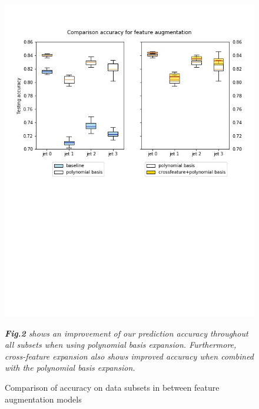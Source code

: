 \documentclass[10pt,a4paper]{article}
\begin{document}
\begin{figure}[H]
\begin{center}
\includegraphics[scale=0.45,trim=0cm 11cm 0cm 2cm, clip=true]{featureAccuracy3.jpeg}
\caption{\label{Fig.2}Comparison of accuracy on data subsets in between feature augmentation models}
\end{center}
\textit{\footnotesize{\textbf{Fig.2} shows an improvement of our prediction accuracy throughout all subsets when using polynomial basis expansion. Furthermore, cross-feature expansion also shows improved accuracy when combined with the polynomial basis expansion.}}
\end{figure}
\end{document}
